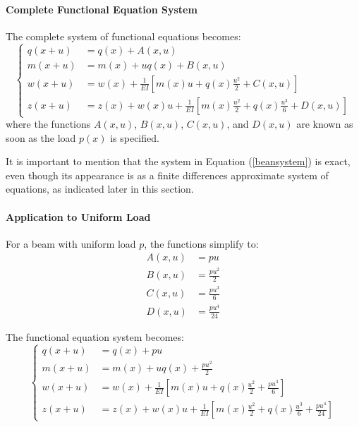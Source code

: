 \paragraph{Complete Functional Equation System}
The complete system of functional equations becomes:
\begin{equation}\label{beansystem}
\boxed{\left\{\begin{aligned}
q(x + u) &= q(x) + A(x, u) \\
m(x + u) &= m(x) + uq(x) + B(x, u) \\
w(x + u) &= w(x) + \frac{1}{EI}\left[m(x)u + q(x)\frac{u^2}{2} + C(x, u)\right] \\
z(x + u) &= z(x) + w(x)u + \frac{1}{EI}\left[m(x)\frac{u^2}{2} + q(x)\frac{u^3}{6} + D(x, u)\right]
\end{aligned}\right.}
\end{equation}
where the functions $A(x, u)$, $B(x, u)$, $C(x, u)$, and $D(x, u)$ are known as soon as the load $p(x)$ is specified.

It is important to mention that the system in Equation (\ref{beansystem}) is exact, even though its appearance is as a finite differences approximate system of equations, as indicated later in this section.

\paragraph{Application to Uniform Load}

For a beam with uniform load $p$, the functions simplify to:
\begin{align}
A(x, u) &= pu \\
B(x, u) &= \frac{pu^2}{2} \\
C(x, u) &= \frac{pu^3}{6} \\
D(x, u) &= \frac{pu^4}{24}
\end{align}

The functional equation system becomes:
\begin{equation}
\boxed{\left\{\begin{aligned}
q(x + u) &= q(x) + pu \\
m(x + u) &= m(x) + uq(x) + \frac{pu^2}{2} \\
w(x + u) &= w(x) + \frac{1}{EI}\left[m(x)u + q(x)\frac{u^2}{2} + \frac{pu^3}{6}\right] \\
z(x + u) &= z(x) + w(x)u + \frac{1}{EI}\left[m(x)\frac{u^2}{2} + q(x)\frac{u^3}{6} + \frac{pu^4}{24}\right]
\end{aligned}\right.}
\end{equation}

